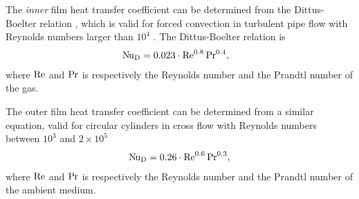 The \emph{inner} film heat transfer coefficient can be determined from the Dittus-Boelter relation \cite{Winterton1998Where,Dittus1985Heat}, which is valid for forced convection in turbulent pipe flow with Reynolds numbers larger than $10^4$ \cite{Bergman2011Fundamentals}. The Dittus-Boelter relation is
\begin{align}
    &\operatorname{N\kern-.09em u}_\mathrm{D} = 0.023\cdot\operatorname{R\kern-.04em e}^{0.8}\operatorname{P\kern-.03em r}^{0.4},
\end{align}
where $\operatorname{R\kern-.04em e}$ and $\operatorname{P\kern-.03em r}$ is respectively the Reynolds number and the Prandtl number of the gas.

The outer film heat transfer coefficient can be determined from a similar equation, valid for circular cylinders in cross flow with Reynolds numbers between $10^3$ and $2\times 10^5$ \cite{Bergman2011Fundamentals}%
\begin{align}
    \operatorname{N\kern-.09em u}_\mathrm{D} = 0.26\cdot\operatorname{R\kern-.04em e}^{0.6}\operatorname{P\kern-.03em r}^{0.3}
, \label{eq:outerFilm}
\end{align}
where $\operatorname{R\kern-.04em e}$ and $\operatorname{P\kern-.03em r}$ is respectively the Reynolds number and the Prandtl number of the ambient medium.

